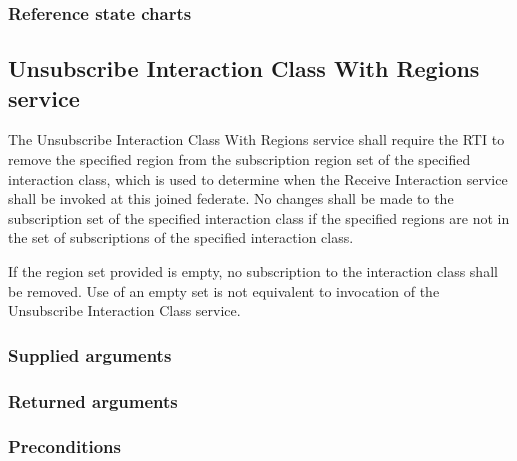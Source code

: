 \begin{compactstdpage}


    \subsubsection{Reference state charts}


    \subsection{Unsubscribe Interaction Class With Regions service}

    The Unsubscribe Interaction Class With Regions service shall require the RTI to remove the specified region from the subscription region set of the specified interaction class, which is used to determine when the Receive Interaction \rtiinitiated{} service shall be invoked at this joined federate. No changes shall be made to the subscription set of the specified interaction class if the specified regions are not in the set of subscriptions of the specified interaction class.

    If the region set provided is empty, no subscription to the interaction class shall be removed. Use of an empty set is not equivalent to invocation of the Unsubscribe Interaction Class service.

    \subsubsection{Supplied arguments}


    \subsubsection{Returned arguments}


    \subsubsection{Preconditions}


\end{compactstdpage}
